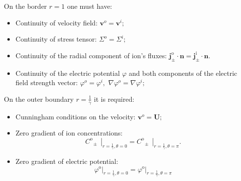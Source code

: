 \documentclass{amsart}
\begin{document}
 On the border  $r=1$ one must have:
 \begin{itemize}
\item	Continuity of velocity field:   ${\mathbf {v}}^o={\mathbf {v}}^i;$
\item	Continuity of stress tensor: $\Sigma^o=\Sigma^i;$
\item	Continuity of the radial component of ion's fluxes:
$\mathbf{{j}}_{\pm }^{\text{o}}\cdot \mathbf{n}=\mathbf{j}_{\pm }^{\text{i}}\cdot \mathbf{n}.$
\item	Continuity of the electric potential $\varphi $ and both components of the electric field strength vector: $\varphi^o=\varphi^i,$ $\nabla \varphi^o=\nabla\varphi^i;$
\end{itemize}
On the outer boundary  $r=\frac{1}{\gamma}$ it is required:\\
\begin{itemize}
\item	Cunningham conditions on the velocity:
${\mathbf {v}}^o={\mathbf {U}};$
\item	Zero  gradient of ion concentrations:
$${{\left. C_{\text{ }\!\!\pm\!\!\text{ }}^{\text{o}} \right|}_{r=\frac{1}{\gamma},\theta =0}}={{\left. C_{\text{ }\!\!\pm\!\!\text{ }}^{\text{o}} \right|}_{r=\frac{1}{\gamma},\theta =\pi }}.$$
\item	Zero  gradient of electric potential:
$${{\left. {{\varphi }^{\text{o}}} \right|}_{r=\frac{1}{\gamma},\theta =0}}={{\left. {{\varphi }^{\text{o}}} \right|}_{r=\frac{1}{\gamma},\theta =\pi }}$$
\end{itemize}
\end{document}

